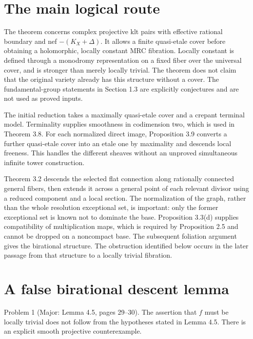 \documentclass[10pt]{article}
\begin{document}
\section*{The main logical route}
The theorem concerns complex projective klt pairs with effective rational boundary and nef \(- (K_X+\Delta)\). It allows a finite quasi-etale cover before obtaining a holomorphic, locally constant MRC fibration. Locally constant is defined through a monodromy representation on a fixed fiber over the universal cover, and is stronger than merely locally trivial. The theorem does not claim that the original variety already has this structure without a cover. The fundamental-group statements in Section 1.3 are explicitly conjectures and are not used as proved inputs.\par
The initial reduction takes a maximally quasi-etale cover and a crepant terminal model. Terminality supplies smoothness in codimension two, which is used in Theorem 3.8. For each normalized direct image, Proposition 3.9 converts a further quasi-etale cover into an etale one by maximality and descends local freeness. This handles the different sheaves without an unproved simultaneous infinite tower construction.\par
Theorem 3.2 descends the selected flat connection along rationally connected general fibers, then extends it across a general point of each relevant divisor using a reduced component and a local section. The normalization of the graph, rather than the whole resolution exceptional set, is important: only the former exceptional set is known not to dominate the base. Proposition 3.3(d) supplies compatibility of multiplication maps, which is required by Proposition 2.5 and cannot be dropped on a noncompact base. The subsequent foliation argument gives the birational structure. The obstruction identified below occurs in the later passage from that structure to a locally trivial fibration.\par
\section*{A false birational descent lemma}
Problem 1 (Major: Lemma 4.5, pages 29–30).  The assertion that \(f\) must be locally trivial does not follow from the hypotheses stated in Lemma 4.5. There is an explicit smooth projective counterexample.\par
\end{document}
